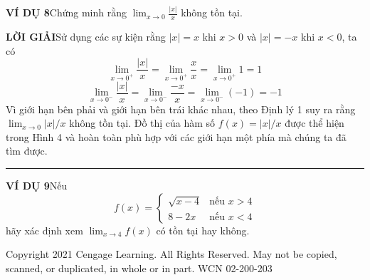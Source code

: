 \begin{minipage}[t]{0.71\textwidth}
    \vspace{3pt}
    \noindent
    \textbf{\textsf{\color{stewartcyan}VÍ DỤ 8}}\hspace{1em}Chứng minh rằng $\displaystyle\lim_{x \to 0} \frac{|x|}{x}$ không tồn tại.

    \vspace{2pt}
    \noindent
    \textbf{\textsf{\color{stewartcyan}LỜI GIẢI}}\hspace{1em}Sử dụng các sự kiện rằng $|x| = x$ khi $x > 0$ và $|x| = -x$ khi $x < 0$, ta có
    \[
    \lim_{x \to 0^+} \frac{|x|}{x} = \lim_{x \to 0^+} \frac{x}{x} = \lim_{x \to 0^+} 1 = 1
    \]
    \[
    \lim_{x \to 0^-} \frac{|x|}{x} = \lim_{x \to 0^-} \frac{-x}{x} = \lim_{x \to 0^-} (-1) = -1
    \]
    Vì giới hạn bên phải và giới hạn bên trái khác nhau, theo Định lý 1 suy ra rằng $\lim_{x \to 0} |x|/x$ không tồn tại. Đồ thị của hàm số $f(x) = |x|/x$ được thể hiện trong Hình 4 và hoàn toàn phù hợp với các giới hạn một phía mà chúng ta đã tìm được.\hfill{\color{stewartcyan}\rule{1.2ex}{1.2ex}}

    \vspace{5pt}
    \noindent
    \textbf{\textsf{\color{stewartcyan}VÍ DỤ 9}}\hspace{1em}Nếu
    \[
    f(x) = \begin{cases} 
    \sqrt{x - 4} & \text{nếu } x > 4 \\ 
    8 - 2x & \text{nếu } x < 4 
    \end{cases}
    \]
    hãy xác định xem $\displaystyle\lim_{x \to 4} f(x)$ có tồn tại hay không.
\end{minipage}

\vfill
\noindent
\begin{minipage}{\textwidth}
    \centering
    \fontsize{6.5}{8}\selectfont\color{gray!80}
    Copyright 2021 Cengage Learning. All Rights Reserved. May not be copied, scanned, or duplicated, in whole or in part. WCN 02-200-203
\end{minipage}
